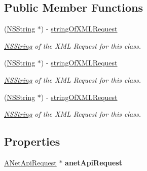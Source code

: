 \subsection*{Public Member Functions}
\begin{DoxyCompactItemize}
\item 
(\hyperlink{class_n_s_string}{NSString} $\ast$) -\/ \hyperlink{interface_auth_net_request_aab99d065f49b7ed086b041c1c70e2975}{stringOfXMLRequest}
\begin{DoxyCompactList}\small\item\em \hyperlink{class_n_s_string}{NSString} of the XML Request for this class. \item\end{DoxyCompactList}\item 
(\hyperlink{class_n_s_string}{NSString} $\ast$) -\/ \hyperlink{interface_auth_net_request_aab99d065f49b7ed086b041c1c70e2975}{stringOfXMLRequest}
\begin{DoxyCompactList}\small\item\em \hyperlink{class_n_s_string}{NSString} of the XML Request for this class. \item\end{DoxyCompactList}\item 
(\hyperlink{class_n_s_string}{NSString} $\ast$) -\/ \hyperlink{interface_auth_net_request_aab99d065f49b7ed086b041c1c70e2975}{stringOfXMLRequest}
\begin{DoxyCompactList}\small\item\em \hyperlink{class_n_s_string}{NSString} of the XML Request for this class. \item\end{DoxyCompactList}\end{DoxyCompactItemize}
\subsection*{Properties}
\begin{DoxyCompactItemize}
\item 
\hypertarget{interface_auth_net_request_a42a664ae8c96bd08b08d5233137eeaac}{
\hyperlink{interface_a_net_api_request}{ANetApiRequest} $\ast$ {\bfseries anetApiRequest}}
\label{interface_auth_net_request_a42a664ae8c96bd08b08d5233137eeaac}

\end{DoxyCompactItemize}


